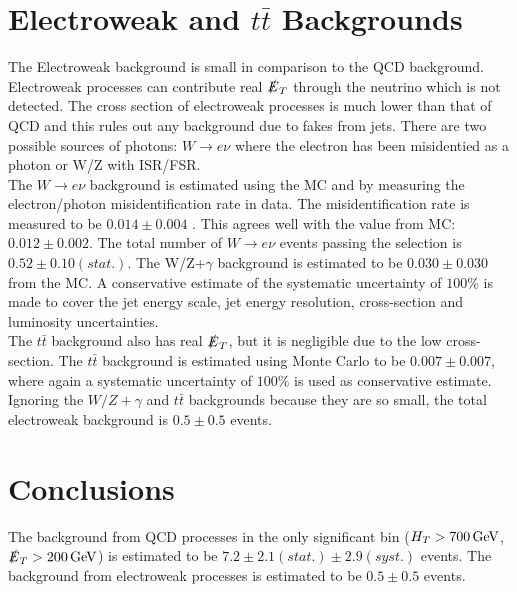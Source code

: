 \section{Electroweak and $t\bar{t}$ Backgrounds}

The Electroweak background is small in comparison to the QCD background.
Electroweak processes can contribute real $\slashed{E}_{T}$ through the neutrino which is 
not detected. The cross section of electroweak processes is much lower than
that of QCD and this rules out any background due to fakes from jets. There are
two possible sources of photons: $W\rightarrow e\nu$ where the electron has been
misidentied as a photon or W/Z with ISR/FSR. \\

The $W\rightarrow e\nu$ background is estimated using the MC and by measuring 
the electron/photon misidentification rate in data. The misidentification rate 
is measured to be $0.014\pm0.004$ \cite{ra3}. This agrees well with the value 
from MC: $0.012\pm0.002$. The total number of $W\rightarrow e\nu$ events passing 
the selection is $0.52\pm0.10(stat.)$. The W/Z+$\gamma$ background is estimated 
to be $0.030\pm0.030$ from the MC. A conservative estimate of the systematic 
uncertainty of $100\unit{\%}$ is made to cover the jet energy scale, jet energy 
resolution, cross-section and luminosity uncertainties. \\

The $t\bar{t}$ background also has real $\slashed{E}_{T}$, but it is negligible due to the
low cross-section. The $t\bar{t}$ background is estimated using Monte Carlo to
be $0.007\pm0.007$, where again a systematic uncertainty of $100\unit{\%}$ is
used as conservative estimate. \\

Ignoring the $W/Z+\gamma$ and $t\bar{t}$ backgrounds because they are so small, 
the total electroweak background is $0.5\pm0.5$ events.
 
\section{Conclusions}

The background from QCD processes in the only significant bin
($H_{T}>700\, \mathrm{GeV}$, $\slashed{E}_{T}>200\, \mathrm{GeV}$) is estimated to be 
$7.2\pm2.1(stat.)\pm2.9(syst.)$ events. The background from electroweak
processes is estimated to be $0.5\pm0.5$ events.
